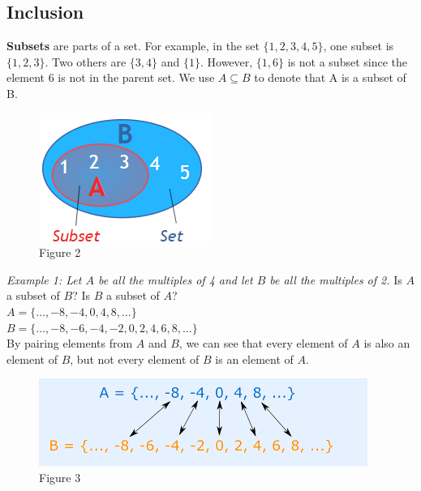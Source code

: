     \subsection{Inclusion}
        \noindent \textbf{Subsets} are parts of a set. For example, in the set $\{1,2,3,4,5\}$,
        one subset is $\{1,2,3\}$. Two others are $\{3,4\}$ and $\{1\}$. However, $\{1,6\}$ is
        not a subset since the element 6 is not in the parent set. We use \textbf{$A \subseteq B$}
        to denote that A is a subset of B.

        \begin{figure} [hbt!]
            \centering
            \includegraphics[scale=0.6]{Resources/Unit1SetTheory/subsets.PNG}
            \caption*{Figure 2}
        \end{figure}

        \noindent \color{blue} \textit{Example 1: Let $A$ be all the multiples of 4 and let
        $B$ be all the multiples of 2.} Is $A$ a subset of $B$? Is $B$ a subset of $A$?
        \color{black} \\

        $A=\{\dots,-8,-4,0,4,8,\dots\}$\\
        $B=\{\dots,-8,-6,-4,-2,0,2,4,6,8,\dots\}$\\
        By pairing elements from $A$ and $B$, we can see that every element of $A$ is also an
        element of $B$, but not every element of $B$ is an element of $A$.\\

        \begin{figure} [hbt!]
            \centering
            \includegraphics[scale=0.6]{Resources/Unit1SetTheory/subset2.PNG}
            \caption*{Figure 3}
        \end{figure}


